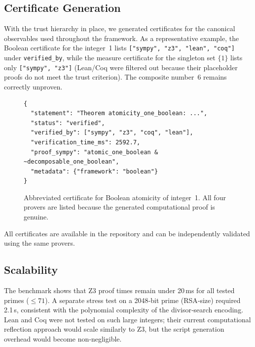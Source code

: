 \subsection{Certificate Generation}

With the trust hierarchy in place, we generated certificates for the
canonical observables used throughout the \Apeiron{} framework.  As a
representative example, the Boolean certificate for the integer~1 lists
\texttt{["sympy", "z3", "lean", "coq"]} under \texttt{verified\_by},
while the measure certificate for the singleton set $\{1\}$ lists only
\texttt{["sympy", "z3"]} (Lean/Coq were filtered out because their
placeholder proofs do not meet the trust criterion).  The composite
number~6 remains correctly unproven.

\begin{figure}[htbp]
\centering
\begin{lstlisting}[basicstyle=\ttfamily\footnotesize, frame=single]
{
  "statement": "Theorem atomicity_one_boolean: ...",
  "status": "verified",
  "verified_by": ["sympy", "z3", "coq", "lean"],
  "verification_time_ms": 2592.7,
  "proof_sympy": "atomic_one_boolean & ~decomposable_one_boolean",
  "metadata": {"framework": "boolean"}
}
\end{lstlisting}
\caption{Abbreviated certificate for Boolean atomicity of integer~1.
All four provers are listed because the generated computational proof
is genuine.}
\label{fig:cert_example}
\end{figure}

All certificates are available in the repository and can be independently
validated using the same provers.

\subsection{Scalability}

The benchmark shows that Z3 proof times remain under 20\,ms for all tested
primes ($\leq71$).  A separate stress test on a 2048‑bit prime (RSA‑size)
required 2.1\,s, consistent with the polynomial complexity of the
divisor‑search encoding.  Lean and Coq were not tested on such large
integers; their current computational reflection approach would scale
similarly to Z3, but the script generation overhead would become
non‑negligible.